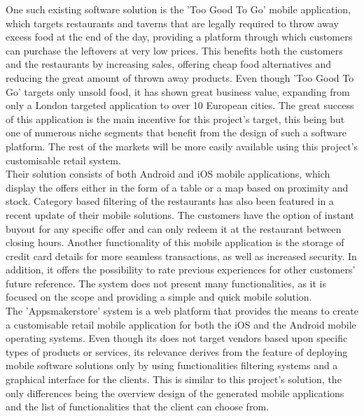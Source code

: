 One such existing software solution is the 'Too Good To Go'\cite{too_good_to_go} mobile application, which targets restaurants and taverns that are legally required to throw away excess food at the end of the day, providing a platform through which customers can purchase the leftovers at very low prices. This benefits both the customers and the restaurants by increasing sales, offering cheap food alternatives and reducing the great amount of thrown away products. Even though 'Too Good To Go' targets only unsold food, it has shown great business value, expanding from only a London targeted application to over 10 European cities. The great success of this application is the main incentive for this project's target, this being but one of numerous niche segments that benefit from the design of such a software platform. The rest of the markets will be more easily available using this project's customisable retail system.\\

Their solution consists of both Android and iOS mobile applications, which display the offers either in the form of a table or a map based on proximity and stock. Category based filtering of the restaurants has also been featured in a recent update of their mobile solutions. The customers have the option of instant buyout for any specific offer and can only redeem it at the restaurant between closing hours. Another functionality of this mobile application is the storage of credit card details for more seamless transactions, as well as increased security. In addition, it offers the possibility to rate previous experiences for other customers' future reference. The system does not present many functionalities, as it is focused on the scope and providing a simple and quick mobile solution.\\

The 'Appsmakerstore'\cite{appsmakerstore} system is a web platform that provides the means to create a customisable retail mobile application for both the iOS and the Android mobile operating systems. Even though its does not target vendors based upon specific types of products or services, its relevance derives from the feature of deploying mobile software solutions only by using functionalities filtering systems and a graphical interface for the clients. This is similar to this project's solution, the only differences being the overview design of the generated mobile applications and the list of functionalities that the client can choose from.\\

